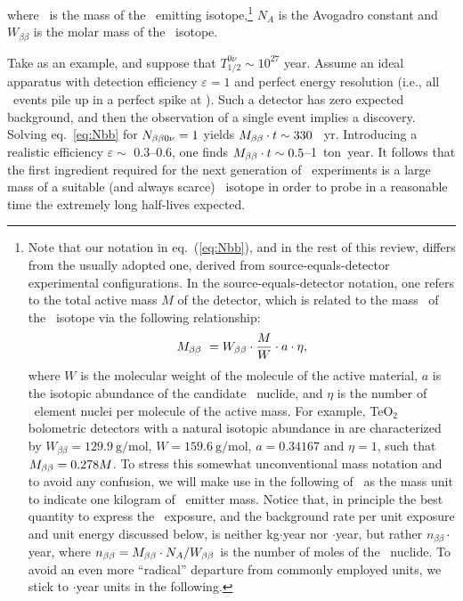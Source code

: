 where \Mbb\ is the mass of the \bb\ emitting isotope,\footnote{Note that our notation in eq.~(\ref{eq:Nbb}), and in the rest of this review, differs from the usually adopted one, derived from source-equals-detector experimental configurations. In the source-equals-detector notation, one refers to the total active mass $M$ of the detector, which is related to the mass \Mbb\ of the \bb\ isotope via the following relationship:
%
\begin{equation}
M_{\beta\beta}\ = W_{\beta\beta}\cdot \frac{M}{W}\cdot a\cdot \eta ,
\label{eq:mbbversusm}
\end{equation}
%
where $W$ is the molecular weight of the molecule of the active material, $a$ is the isotopic abundance of the candidate \bbonu\ nuclide, and $\eta$ is the number of \bbonu\ element nuclei per molecule of the active mass. For example, TeO$_2$ bolometric detectors with a natural isotopic abundance in  are characterized by $W_{\beta\beta}=129.9\ \mathrm{g/mol}$, $W=159.6\ \mathrm{g/mol}$, $a=0.34167$ and $\eta=1$, such that $M_{\beta\beta} = 0.278 M$. To stress this somewhat unconventional mass notation and to avoid any confusion, we will make use in the following of \kgbb\ as the mass unit to indicate one kilogram of \bb\ emitter mass. Notice that, in principle the best quantity to express the \bbonu\ exposure, and the background rate per unit exposure and unit energy discussed below, is neither kg$\cdot$year nor \kgbb $\cdot$year, but rather $n_{\beta\beta}\cdot$year, where $n_{\beta\beta}=M_{\beta\beta} \cdot N_A/W_{\beta\beta}$ is the number of moles of the \bb\ nuclide. To avoid an even more ``radical'' departure from commonly employed units, we stick to \kgbb$\cdot$year units in the following.} 
%
$N_{A}$ is the Avogadro constant and $W_{\beta\beta}$ is the molar mass of the \bb\ isotope.

Take  as an example, and suppose that 
$T_{1/2}^{0\nu}\sim 10^{27}$ year. Assume an ideal apparatus with detection efficiency $\varepsilon =1$ and perfect energy resolution (i.e., all \bbonu\ events pile up in a perfect spike at \Qbb). Such a detector has zero expected background, and then the observation of a single event implies a discovery. Solving eq.~\ref{eq:Nbb} for $ N_{\beta\beta0\nu}=1$ yields $M_{\beta\beta} \cdot t \sim 330$ \kgbb~yr. %
Introducing a realistic efficiency $\varepsilon \sim$ 0.3--0.6, one finds $M_{\beta\beta} \cdot t \sim 0.5$--1~ton~year. It follows that the first ingredient required for the next generation of \bbonu\ experiments is a 
large mass of a suitable (and always scarce) \bb\ isotope in order to probe in a reasonable time the extremely long half-lives expected. 

